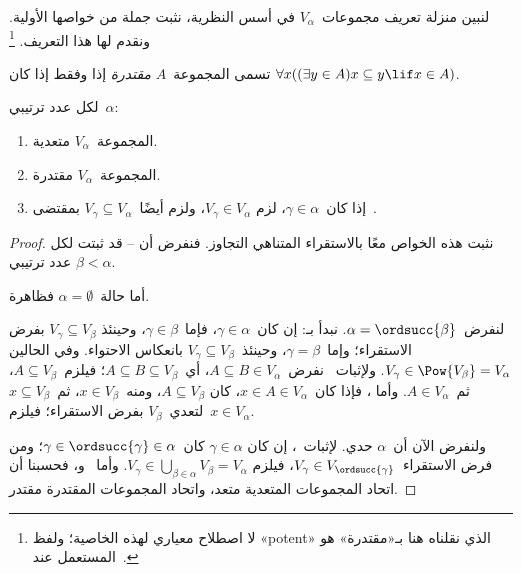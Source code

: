 \documentclass[../../../include/open-logic-section]{subfiles}
\begin{document}

لنبين منزلة تعريف مجموعات~$V_\alpha$ في أسس النظرية، نثبت جملة
من خواصها الأولية. ونقدم لها هذا التعريف.
\footnote{لا اصطلاح معياري لهذه الخاصية؛ ولفظ «potent» الذي نقلناه
هنا بـ«مقتدرة» هو المستعمل عند~\citet{ButtonLT1}.}
\begin{defn}
تسمى المجموعة~$A$ \emph{مقتدرة} إذا وفقط إذا كان
$\forall x((\exists y \in A)x \subseteq y \lif x \in A)$.
\end{defn}
\begin{lem}
لكل عدد ترتيبي~$\alpha$:
\begin{enumerate}
\item{} المجموعة~$V_\alpha$ متعدية.
\item{} المجموعة~$V_\alpha$ مقتدرة.
\item{} إذا كان~$\gamma \in \alpha$، لزم
$V_\gamma \in V_\alpha$، ولزم أيضًا~$V_\gamma \subseteq V_\alpha$
بمقتضى~.
\end{enumerate}
\end{lem}

\begin{proof}
نثبت هذه الخواص معًا بالاستقراء المتناهي التجاوز. فنفرض أن
-- قد ثبتت لكل عدد ترتيبي
$\beta < \alpha$.

أما حالة~$\alpha = \emptyset$ فظاهرة.

لنفرض~$\alpha = \ordsucc{\beta}$. نبدأ بـ:
إن كان~$\gamma \in \alpha$، فإما~$\gamma \in \beta$، وحينئذ
$V_\gamma \subseteq V_\beta$ بفرض الاستقراء؛ وإما~$\gamma = \beta$،
وحينئذ~$V_\gamma \subseteq V_\beta$ بانعكاس الاحتواء. وفي الحالين
$V_\gamma \in \Pow{V_\beta} = V_\alpha$. ولإثبات~
نفرض~$A \subseteq B \in V_\alpha$، أي~$A \subseteq B \subseteq V_\beta$؛
فيلزم~$A \subseteq V_\beta$، ثم~$A \in V_\alpha$. وأما
، فإذا كان~$x \in A \in V_\alpha$، كان
$A \subseteq V_\beta$، ومنه~$x \in V_\beta$، ثم~$x \subseteq V_\beta$
لتعدي~$V_\beta$ بفرض الاستقراء؛ فيلزم~$x \in V_\alpha$.

ولنفرض الآن أن~$\alpha$ حدي. لإثبات~، إن كان
$\gamma \in \alpha$ كان~$\gamma \in \ordsucc{\gamma} \in \alpha$؛
ومن فرض الاستقراء~$V_\gamma \in V_{\ordsucc{\gamma}}$، فيلزم
$V_\gamma \in \bigcup_{\beta \in \alpha} V_\beta = V_\alpha$.
وأما~ و، فحسبنا أن اتحاد
المجموعات المتعدية متعد، واتحاد المجموعات المقتدرة مقتدر.
\end{proof}
\end{document}

